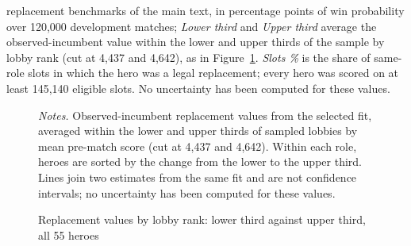 \documentclass[11pt]{article}
\begin{document}
\begin{landscape}
\begin{minipage}{\linewidth}
replacement benchmarks of the main text, in percentage points of win probability over 120,000
development matches; \emph{Lower third} and \emph{Upper third} average the observed-incumbent value within
the lower and upper thirds of the sample by lobby rank (cut at 4,437 and 4,642), as in
Figure~\ref{fig:rank-all}. \emph{Slots \%} is the share of same-role slots in which the hero was a legal
replacement; every hero was scored on at least 145,140 eligible slots. No uncertainty has been
computed for these values.
\end{minipage}
\end{landscape}

\begin{figure}[H]\centering
\caption{Replacement values by lobby rank: lower third against upper third, all 55 heroes}\label{fig:rank-all}
\vspace{2pt}


\begin{minipage}{0.95\linewidth}\footnotesize\vspace{2pt}
\emph{Notes.} Observed-incumbent replacement values from the selected fit, averaged within the lower and
upper thirds of sampled lobbies by mean pre-match score (cut at 4,437 and 4,642). Within each
role, heroes are sorted by the change from the lower to the upper third. Lines join two estimates from the
same fit and are not confidence intervals; no uncertainty has been computed for these values.
\end{minipage}
\end{figure}
\end{document}
